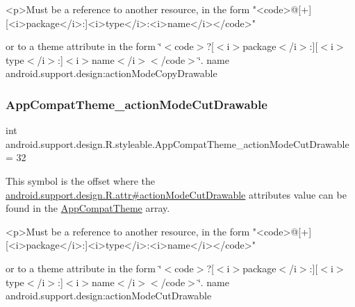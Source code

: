 \begin{DoxyVerb}      <p>Must be a reference to another resource, in the form "<code>@[+][<i>package</i>:]<i>type</i>:<i>name</i></code>"
\end{DoxyVerb}
 or to a theme attribute in the form \char`\"{}$<$code$>$?\mbox{[}$<$i$>$package$<$/i$>$\+:\mbox{]}\mbox{[}$<$i$>$type$<$/i$>$\+:\mbox{]}$<$i$>$name$<$/i$>$$<$/code$>$\char`\"{}.  name android.\+support.\+design\+:action\+Mode\+Copy\+Drawable \mbox{\label{classandroid_1_1support_1_1design_1_1R_1_1styleable_aa4f155cf001a007b34829305ec1b8bf4}} 
\subsubsection{\texorpdfstring{App\+Compat\+Theme\+\_\+action\+Mode\+Cut\+Drawable}{AppCompatTheme\_actionModeCutDrawable}}
{\footnotesize\ttfamily int android.\+support.\+design.\+R.\+styleable.\+App\+Compat\+Theme\+\_\+action\+Mode\+Cut\+Drawable = 32\hspace{0.3cm}{\ttfamily [static]}}

This symbol is the offset where the \hyperlink{classandroid_1_1support_1_1design_1_1R_1_1attr_a3b413691753b336a34ebf1925fa20ae7}{android.\+support.\+design.\+R.\+attr\#action\+Mode\+Cut\+Drawable} attribute\textquotesingle{}s value can be found in the \hyperlink{classandroid_1_1support_1_1design_1_1R_1_1styleable_afb351dc8de20cbd4c89abe360373010c}{App\+Compat\+Theme} array.

\begin{DoxyVerb}      <p>Must be a reference to another resource, in the form "<code>@[+][<i>package</i>:]<i>type</i>:<i>name</i></code>"
\end{DoxyVerb}
 or to a theme attribute in the form \char`\"{}$<$code$>$?\mbox{[}$<$i$>$package$<$/i$>$\+:\mbox{]}\mbox{[}$<$i$>$type$<$/i$>$\+:\mbox{]}$<$i$>$name$<$/i$>$$<$/code$>$\char`\"{}.  name android.\+support.\+design\+:action\+Mode\+Cut\+Drawable \mbox{\label{classandroid_1_1support_1_1design_1_1R_1_1styleable_a87e11e5ef34e5a6b9426ee90ef001590}} 
